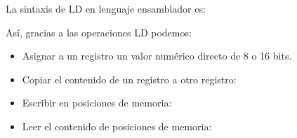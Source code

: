 \documentclass[letterpaper,10pt,spanish]{sphinxmanual}
\begin{document}
La sintaxis de LD en lenguaje ensamblador es:

\begin{sphinxVerbatim}[commandchars=\\\{\}]
  
\end{sphinxVerbatim}

Así, gracias a las operaciones LD podemos:
\begin{itemize}
\item {} 
Asignar a un registro un valor numérico directo de 8 o 16 bits.

\end{itemize}

\begin{sphinxVerbatim}[commandchars=\\\{\}]
           
          
       
\end{sphinxVerbatim}
\begin{itemize}
\item {} 
Copiar el contenido de un registro a otro registro:

\end{itemize}

\begin{sphinxVerbatim}[commandchars=\\\{\}]
            
          
\end{sphinxVerbatim}
\begin{itemize}
\item {} 
Escribir en posiciones de memoria:

\end{itemize}

\begin{sphinxVerbatim}[commandchars=\\\{\}]
      
        
\end{sphinxVerbatim}
\begin{itemize}
\item {} 
Leer el contenido de posiciones de memoria:

\end{itemize}
\end{document}
